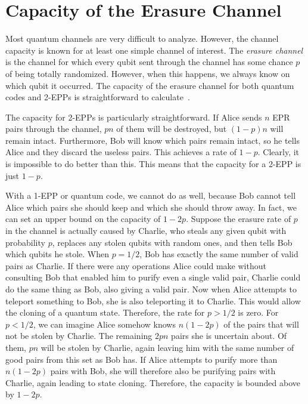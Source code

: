 \section{Capacity of the Erasure Channel}

Most quantum channels are very difficult to analyze.  However, the
channel capacity is known for at least one simple channel of interest.  The
	{\em erasure channel} is the channel for which every qubit sent through the
channel has some chance $p$ of being totally randomized.  However, when
this happens, we always know on which qubit it occurred.  The capacity of
the erasure channel for both quantum codes and 2-EPPs is straightforward
to calculate~\cite{bennett-erasure}.

The capacity for 2-EPPs is particularly straightforward.  If Alice sends $n$
EPR pairs through the channel, $pn$ of them will be destroyed, but $(1-
p)n$ will remain intact.  Furthermore, Bob will know which pairs remain
intact, so he tells Alice and they discard the useless pairs.  This achieves a
rate of $1-p$.  Clearly, it is impossible to do better than this.  This means
that the capacity for a 2-EPP is just $1-p$.

With a 1-EPP or quantum code, we cannot do as well, because Bob cannot
tell Alice which pairs she should keep and which she should throw away.  In
fact, we can set an upper bound on the capacity of $1-2p$.  Suppose the erasure
rate of $p$ in the channel is actually caused by Charlie, who steals any
given qubit with probability $p$, replaces any stolen qubits with random
ones, and then tells Bob which qubits he stole.  When $p = 1/2$, Bob has
exactly the same number of valid pairs as Charlie.  If there were any
operations Alice could make without consulting Bob that enabled him to
purify even a single valid pair, Charlie could do the same thing as Bob, also
giving a valid pair.  Now when Alice attempts to teleport something to Bob,
she is also teleporting it to Charlie.  This would allow the cloning of a
quantum state.  Therefore, the rate for $p>1/2$ is zero.  For $p<1/2$, we
can imagine Alice somehow knows $n(1-2p)$ of the pairs that will not be
stolen by Charlie.  The remaining $2pn$ pairs she is uncertain about.  Of
them, $pn$ will be stolen by Charlie, again leaving him with the same
number of good pairs from this set as Bob has.  If Alice attempts to purify
more than $n(1-2p)$ pairs with Bob, she will therefore also be purifying
pairs with Charlie, again leading to state cloning.  Therefore, the capacity is
bounded above by $1-2p$.


